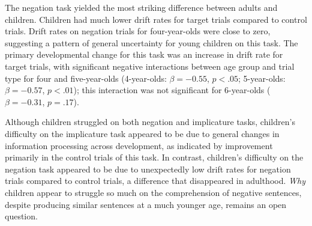 \documentclass[10pt,letterpaper]{article}
\newcommand{\ejy}[1]{\textcolor{Blue}{[ejy: #1]}}
\newcommand{\aen}[1]{\textcolor{DarkOrange}{[aen: #1]}}
\begin{document}
The negation task yielded the most striking difference between adults and children. Children had much lower drift rates for target trials compared to control trials. Drift rates on negation trials for four-year-olds were close to zero, suggesting a pattern of general uncertainty for young children on this task. The primary developmental change for this task was an increase in drift rate for target trials, with significant negative interactions between age group and trial type for four and five-year-olds (4-year-olds: $\beta = -0.55$, $p <.05$; 5-year-olds: $\beta = -0.57$, $p <.01$); this interaction was not significant for 6-year-olds ($\beta = -0.31$, $p = .17$).



Although children struggled on both negation and implicature tasks, children's difficulty on the implicature task appeared to be due to general changes in information processing across development, as indicated by improvement primarily in the control trials of this task. In contrast, children's difficulty on the negation task appeared to be due to unexpectedly low drift rates for negation trials compared to control trials, a difference that disappeared in adulthood. \emph{Why} children appear to struggle so much on the comprehension of negative sentences, despite producing similar sentences at a much younger age, remains an open question.
\end{document}
